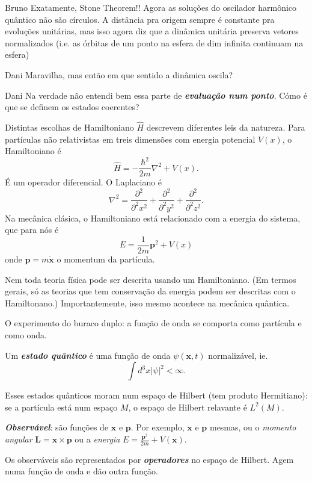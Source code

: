 \begin{thing3}{Bruno}\leavevmode
	Exatamente, Stone Theorem!!
Agora as soluções do oscilador harmônico quântico não são círculos. A distância pra origem sempre é constante pra evoluções unitárias, mas isso agora diz que a dinâmica unitária preserva vetores normalizados (i.e. as órbitas de um ponto na esfera de dim infinita continuam na esfera)
\end{thing3}

\begin{thing5}{Dani}\leavevmode
	Maravilha, mas então em que sentido a dinâmica oscila?
\end{thing5}

\begin{thing5}{Dani}\leavevmode
	Na verdade não entendi bem essa parte de \textit{\textbf{evaluação num ponto}}. Cómo é que se definem os estados coerentes? 
\end{thing5}

 Distintas escolhas de Hamiltoniano $\hat{H}$ descrevem diferentes leis da natureza. Para partículas não relativistas em treis dimensões com energia potencial $V(x)$, o Hamiltoniano  é
 \[\hat{H}=-\frac{\hbar^2}{2m}\nabla^2+V(x).\]
 \'E um operador diferencial. O Laplaciano \'e
 \[\nabla^2=\frac{\partial^2}{\partial^2 x^2}+\frac{\partial^2}{\partial^2 y^2}+\frac{\partial^2}{\partial^2z^2}.\]
 Na mec\^anica cl\'asica, o Hamiltoniano est\'a relacionado com a energia do sistema, que para n\'os \'e
 \[E=\frac{1}{2m}\mathbf{p}^2+V(x)\]
 onde $\mathbf{p}=m\dot{\mathbf{x}}$ o momentum da partícula.

 Nem toda teoria f\'isica pode ser descrita usando um Hamiltoniano. (Em termos gerais, s\'o as teorias que tem conserva\c c\~ao da energia podem ser descritas com o Hamiltonano.) Importantemente, isso mesmo acontece na mecânica quântica.

 O experimento do buraco duplo: a função de onda se comporta como part\'icula e como onda.

 \begin{defn}
 	Um \textit{\textbf{estado quântico}} é uma função de onda $\psi(\mathbf{x},t)$ normalizável, ie.
	\[\int d^3x|\psi|^2<\infty.\]
 \end{defn}
 Esses estados qu\^anticos moram num espaço de Hilbert (tem produto Hermitiano): se a part\'icula est\'a num espaço $M$, o espaço de Hilbert relavante \'e $L^2(M)$.

\begin{defn}
	\textit{\textbf{Observ\'avel}}: s\~ao fun\c c\~oes  de $\mathbf{x}$ e $\mathbf{p}$. Por exemplo, $\mathbf{x}$ e $\mathbf{p}$ mesmas, ou o \textit{momento angular} $\mathbf{L}=\mathbf{x}\times \mathbf{p}$ ou a \textit{energia} $E=\frac{\mathbf{p}^2}{2m}+V(\mathbf{x})$.

	Os observ\'aveis s\~ao representados por \textit{\textbf{operadores}} no espaço de Hilbert. Agem numa fun\c c\~ao de onda e d\~ao outra fun\c c\~ao.
\end{defn}

